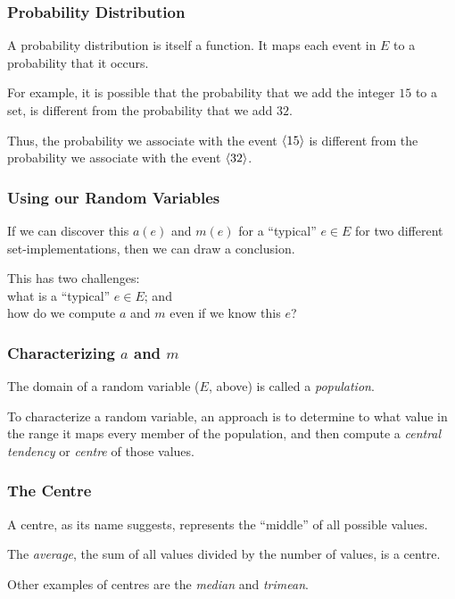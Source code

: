 \begin{frame}
\frametitle{Probability Distribution}
\begin{changemargin}{1cm}

A probability distribution is itself a function. 
It maps
each event in $E$ to a probability that it occurs.

For example, it is possible that the
probability that we add the integer $15$ to a set,
is different from the probability that we add $32$.

Thus, the probability we associate with the event
$\langle 15 \rangle$ is different from the probability
we associate with the event $\langle 32 \rangle$.

\end{changemargin}
\end{frame}


\begin{frame}
\frametitle{Using our Random Variables}
\begin{changemargin}{1cm}

If we can discover this $a(e)$ and $m(e)$
for a ``typical'' $e \in E$ for
two different set-implementations, then we can draw a conclusion.


This has two challenges: \\
\quad what is a ``typical'' $e \in E$; and\\
\quad how do we compute $a$ and $m$ even if we know this $e$?

\end{changemargin}
\end{frame}


\begin{frame}
\frametitle{Characterizing $a$ and $m$}
\begin{changemargin}{1cm}

The domain of a random variable ($E$, above) is called a
\emph{population}. 

To characterize a random variable, an approach
is to determine to what value in the range it maps every member of
the population, and then compute a \emph{central tendency} or
\emph{centre} of those values.

\end{changemargin}
\end{frame}


\begin{frame}
\frametitle{The Centre}
\begin{changemargin}{1cm}

A centre, as its name suggests, represents the ``middle'' of
all possible values. 

The \emph{average}, the sum of all values
divided by the number of values, is a centre. 

Other examples of
centres are the \emph{median} and \emph{trimean}.

\end{changemargin}
\end{frame}


